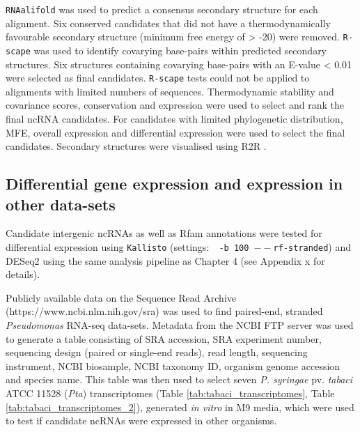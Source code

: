 \texttt{RNAalifold} \citep{Bernhart_Hofacker_Will_Gruber_Stadler_2008x} was used to predict a consensus secondary structure for each alignment. Six conserved candidates that did not have a thermodynamically favourable secondary structure (minimum free energy of > -20) were removed. \texttt{R-scape} \citep{Rivas_Clements_Eddy_2017x} was used to identify covarying base-pairs within predicted secondary structures. Six structures containing covarying base-pairs with an E-value < 0.01 were selected as final candidates. \texttt{R-scape} tests could not be applied to alignments with limited numbers of sequences. Thermodynamic stability and covariance scores, conservation and expression were used to select and rank the final ncRNA candidates. For candidates with limited phylogenetic distribution, MFE, overall expression and differential expression were used to select the final candidates. Secondary structures were visualised using R2R \citep{Weinberg2011-nxxx}.
\subsection{Differential gene expression and expression in other data-sets}
Candidate intergenic ncRNAs as well as Rfam annotations were tested for differential expression using \texttt{Kallisto} (settings$:$ \texttt{ -b 100 $--$rf-stranded}) \citep{Bray2016-xxoi} and DESeq2 \citep{Love2014-dccv} using the same analysis pipeline as Chapter 4 (see Appendix x for details). 

Publicly available data on the Sequence Read Archive (https://www.ncbi.nlm.nih.gov/sra) was used to find paired-end, stranded \textit{Pseudomonas} RNA-seq data-sets. Metadata from the NCBI FTP server was used to generate a table consisting of SRA accession, SRA experiment number, sequencing design (paired or single-end reads), read length, sequencing instrument, NCBI biosample, NCBI taxonomy ID, organism genome accession and species name. This table was then used to select seven \textit{P. syringae} pv. \textit{tabaci} ATCC 11528 (\textit{Pta}) transcriptomes (Table \ref{tab:tabaci_transcriptomes}, Table \ref{tab:tabaci_transcriptomes_2}), generated \textit{in vitro} in M9 media, which were used to test if candidate ncRNAs were expressed in other organisms.

